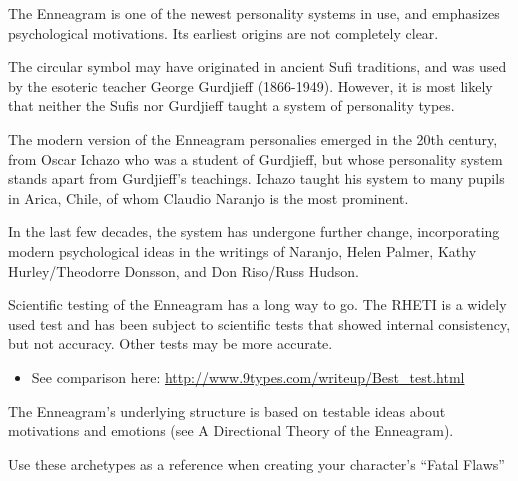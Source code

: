 \documentclass[openleft,oneside,showtrims]{memoir}
\begin{document}
The Enneagram is one of the newest personality systems in use, and emphasizes psychological motivations.  Its earliest origins are not completely clear. 

The circular symbol may have originated in ancient Sufi traditions, and was used by the esoteric teacher George Gurdjieff (1866-1949).  However, it is most likely that neither the Sufis nor Gurdjieff taught a system of personality types.  

The modern version of the Enneagram personalies emerged in the 20th century, from Oscar Ichazo who was a student of Gurdjieff, but whose personality system stands apart from Gurdjieff's teachings.  Ichazo taught his system to many pupils in Arica, Chile, of whom Claudio Naranjo is the most prominent.  

In the last few decades, the system has undergone further change, incorporating modern psychological ideas in the writings of Naranjo, Helen Palmer, Kathy Hurley/Theodorre Donsson, and Don Riso/Russ Hudson.

Scientific testing of the Enneagram has a long way to go.  The RHETI is a widely used test and has been subject to scientific tests that showed internal consistency, but not accuracy. Other tests may be more accurate. 

\begin{itemize}
\item See comparison here: \url{http://www.9types.com/writeup/Best\_test.html}
\end{itemize}

The Enneagram's underlying structure is based on testable ideas about motivations and emotions (see A Directional Theory of the Enneagram).

Use these archetypes as a reference when creating your character’s ``Fatal Flaws''
\end{document}
